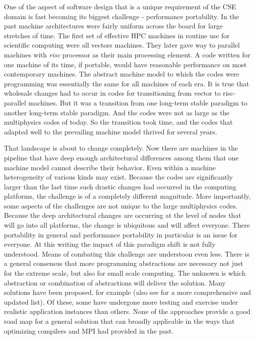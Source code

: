 One of the aspect of software design that is a unique requirement of
the CSE domain is fast becoming its biggest challenge - performance
portability. In the past machine architectures were fairly uniform
across the board for large stretches of time. The first set of
effective HPC machines in routine use for scientific computing were
all vectors machines. They later gave way to parallel machines with
{\em risc} processor as their main processing element. A code written
for one machine of its time, if portable, would have reasonable
performance on most contemporary machines. The abstract machine model
to which the codes were programming was essentially the same for all
machines of each era. It is true that wholesale changes had to occur
in codes for transitioning from vector to risc-parallel machines. But
it was a transition from one long-term stable paradigm to another
long-term stable paradigm. And the codes were not as large as the
multiphysics codes of today. So the transition took time, and the
codes that adapted well to the prevailing machine model thrived for
several years.  

That landscape is about to change completely. Now there are machines
in the pipeline that have deep enough architectural differences among
them that one machine model cannot describe their behavior. Even
within a machine heterogeneity of various kinds may exist. Because
the codes are significantly larger than the last time such drastic
changes had occurred in the computing platforms, the challenge is of a
completely different magnitude. More importantly, some aspects of the
challenges are not unique to the large multiphysics codes. Because the
deep architectural changes are occurring at the level of nodes that
will go into all platforms, the change is ubiquitous and will
affect everyone. There portability in general and performance
portability in particular is an issue for everyone. At this writing
the impact of this paradigm shift is not fully understood. Means of
combating this challenge are understoon even less. There is a general
consensus that more programming abstractions are necessary not just
for the extreme scale, but also for small scale computing. The unknown
is which abstraction or combination of abstractions will deliver the
solution. Many solutions have been proposed, for example \cite{} (also
see \cite{IDEAS Howtos} for a more comprehensive and updated
list). Of these, some have undergone more testing and exercise under
realistic application instances than others. None of the approaches
provide a good road map for a general solution that can broadly
applicable in the ways that optimizing compilers and MPI had provided
in the past.